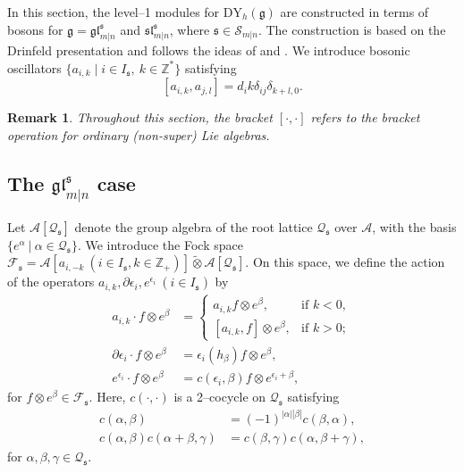 \documentclass[a4paper,12pt]{article}
\newtheorem{rema}[theo]{Remark}
\numberwithin{equation}{section}
\begin{document}
In this section, the level--1 modules for $\mathrm{DY}_{h}(\mathfrak{g})$ are constructed in terms of bosons for $\mathfrak{g}=\mathfrak{gl}^{\mathfrak{s}}_{m|n}$ and $\mathfrak{sl}^{\mathfrak{s}}_{m|n}$, where $\mathfrak{s}\in\mathcal{S}_{m|n}$. The construction is based on the Drinfeld presentation and follows the ideas of \cite{I96} and \cite{JYL20}. We introduce bosonic oscillators $\{a_{i,k} \mid i\in I_{\mathfrak{s}}, ~k\in\mathbb{Z}^{*}\}$ satisfying
$$
[a_{i,k},a_{j,l}]=d_{i}k\delta_{ij}\delta_{k+l,0}.
$$

\begin{rema}
Throughout this section, the bracket $[\cdot,\cdot]$ refers to the bracket operation for ordinary (non-super) Lie algebras.
\end{rema}

\subsection{The $\mathfrak{gl}^{\mathfrak{s}}_{m|n}$ case}

Let $\mathcal{A}[\mathcal{Q}_{\mathfrak{s}}]$ denote the group algebra of the root lattice $\mathcal{Q}_{\mathfrak{s}}$ over $\mathcal{A}$, with the basis $\{e^{\alpha}~|~\alpha\in \mathcal{Q}_{\mathfrak{s}}\}$. We introduce the Fock space $\mathcal{F}_{\mathfrak{s}}=\mathcal{A}[a_{i,-k}~(i \in I_{\mathfrak{s}}, k\in\mathbb{Z}_{+})] \widetilde{\otimes}\mathcal{A}[\mathcal{Q}_{\mathfrak{s}}]$. On this space, we define the action of the operators $a_{i,k}, \partial \epsilon_{i}, e^{\epsilon_{i}}~(i \in I_{\mathfrak{s}})$ by
\begin{align*}
a_{i,k}\cdot f\otimes e^{\beta}&=\left\{\begin{array}{ll}
a_{i,k}f\otimes e^{\beta}, & \text{if } k<0, \\
 \left[a_{i,k},f\right] \otimes e^{\beta}, & \text{if } k>0;
\end{array}
 \right.\\
\partial \epsilon_{i}\cdot f\otimes e^{\beta}&=\epsilon_{i}(h_{\beta}) f\otimes e^{\beta},\\
e^{\epsilon_{i}}\cdot f\otimes e^{\beta}&=c(\epsilon_{i},\beta)f\otimes e^{\epsilon_{i}+\beta},
\end{align*}
for $f\otimes e^{\beta}\in \mathcal{F}_{\mathfrak{s}}$. Here, $c(\cdot,\cdot)$ is a 2--cocycle on $\mathcal{Q}_{\mathfrak{s}}$ satisfying 
\begin{align*}
c(\alpha,\beta)&=(-1)^{|\alpha||\beta|}c(\beta,\alpha),\\
c(\alpha,\beta)c(\alpha+\beta,\gamma)&=c(\beta,\gamma)c(\alpha,\beta+\gamma),
\end{align*}
for $\alpha,\beta,\gamma\in \mathcal{Q}_{\mathfrak{s}}$.
\end{document}

